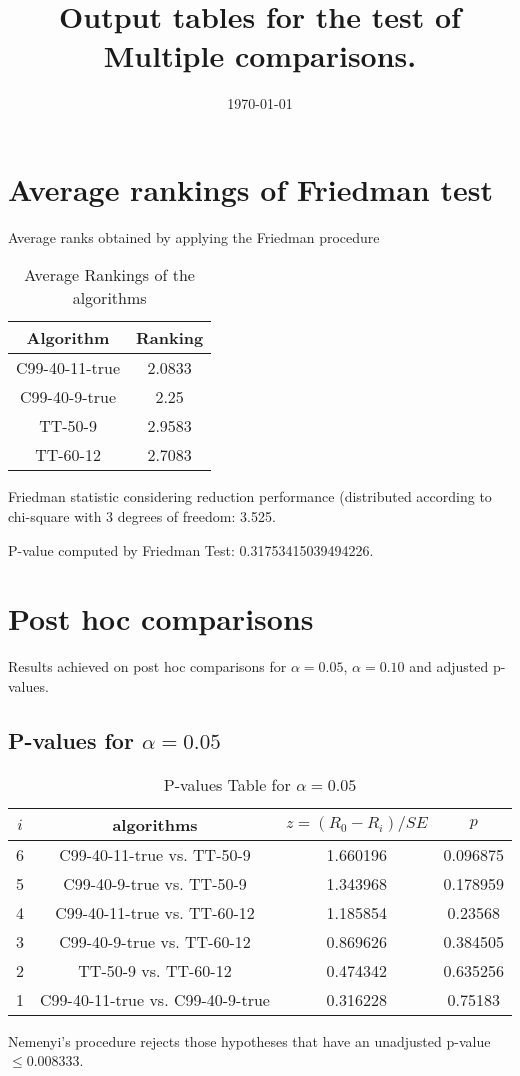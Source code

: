 \documentclass[a4paper,10pt]{article}
\title{Output tables for the test of Multiple comparisons.}
\author{}
\date{\today}
\begin{document}
\begin{landscape}
\pagestyle{empty}
\maketitle
\thispagestyle{empty}
\section{Average rankings of Friedman test}



Average ranks obtained by applying the Friedman procedure

\begin{table}[!htp]
\centering
\begin{tabular}{|c|c|}\hline
Algorithm&Ranking\\\hline
C99-40-11-true & 2.0833\\
C99-40-9-true & 2.25\\
TT-50-9 & 2.9583\\
TT-60-12 & 2.7083\\
\hline
\end{tabular}
\caption{Average Rankings of the algorithms}
\end{table}

Friedman statistic considering reduction performance (distributed according to chi-square with 3 degrees of freedom: 3.525.

P-value computed by Friedman Test: 0.31753415039494226.\newline



\pagebreak

\section{Post hoc comparisons}

Results achieved on post hoc comparisons for $\alpha = 0.05$, $\alpha = 0.10$ and adjusted p-values.

\subsection{P-values for $\alpha=0.05$}

\begin{table}[!htp]
\centering\scriptsize
\begin{tabular}{cccc}
$i$&algorithms&$z=(R_0 - R_i)/SE$&$p$\\
\hline6&C99-40-11-true vs. TT-50-9&1.660196&0.096875\\
5&C99-40-9-true vs. TT-50-9&1.343968&0.178959\\
4&C99-40-11-true vs. TT-60-12&1.185854&0.23568\\
3&C99-40-9-true vs. TT-60-12&0.869626&0.384505\\
2&TT-50-9 vs. TT-60-12&0.474342&0.635256\\
1&C99-40-11-true vs. C99-40-9-true&0.316228&0.75183\\
\hline
\end{tabular}
\caption{P-values Table for $\alpha=0.05$}
\end{table}Nemenyi's procedure rejects those hypotheses that have an unadjusted p-value $\le0.008333$.


\end{landscape}
\end{document}
